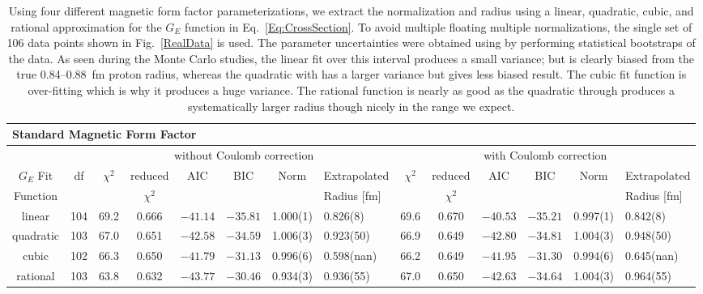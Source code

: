 \documentclass[10pt,superscriptaddress,aps,prc,twocolumn]{revtex4-1}
\begin{document}
\begin{table}
\caption{Using four different magnetic form factor parameterizations, we extract the normalization
and radius using a linear, quadratic, cubic, and rational approximation for the $G_E$ function in 
Eq.~\ref{Eq:CrossSection}.
To avoid multiple floating multiple normalizations, the single set of 106 data points 
shown in Fig.~\ref{RealData} is used.
The parameter uncertainties were obtained using by performing statistical bootstraps of the data.
As seen during the Monte Carlo studies, the linear fit over this interval produces a small variance; 
but is clearly biased from the true 0.84--0.88~fm proton radius, whereas the quadratic with has a 
larger variance but gives less biased result.   The cubic fit function is over-fitting which is 
why it produces a huge variance.   The rational function is nearly as good as the quadratic through
produces a systematically larger radius though nicely in the range we expect.}
\begin{tabular}{cc|cccccl|cccccl}                                                  \hline \hline
\multicolumn{14}{l}{Standard Magnetic Form Factor}                                 \\ \hline
          &     & \multicolumn{6}{c}{without Coulomb correction}                 & \multicolumn{6}{|c}{with Coulomb correction} \\
$G_E$ Fit & df  & $\chi^2$ & reduced   & AIC    & BIC    & Norm      & Extrapolated& $\chi^2$ & reduced   & AIC    & BIC    & Norm      & Extrapolated    \\  
Function  &     &          & $\chi^2$  &        &        &           & Radius [fm]      &          & $\chi^2$  &        &        &           & Radius [fm]        \\ \hline
linear    & 104 &  69.2    & 0.666     &$-41.14$&$-35.81$& 1.000(1)  & 0.826(8)  &  69.6    & 0.670     &$-40.53$&$-35.21$& 0.997(1)  & 0.842(8)    \\
quadratic & 103 &  67.0    & 0.651     &$-42.58$&$-34.59$& 1.006(3)  & 0.923(50) &  66.9    & 0.649     &$-42.80$&$-34.81$& 1.004(3)  & 0.948(50)   \\
cubic     & 102 &  66.3    & 0.650     &$-41.79$&$-31.13$& 0.996(6)  & 0.598(nan)&  66.2    & 0.649     &$-41.95$&$-31.30$& 0.994(6)  & 0.645(nan)   \\    
rational  & 103 &  63.8    & 0.632     &$-43.77$&$-30.46$& 0.934(3)  & 0.936(55) &  67.0    & 0.650     &$-42.63$&$-34.64$& 1.004(3)  & 0.964(55)   \\ \hline \hline

\end{tabular}
\end{table}
\end{document}
